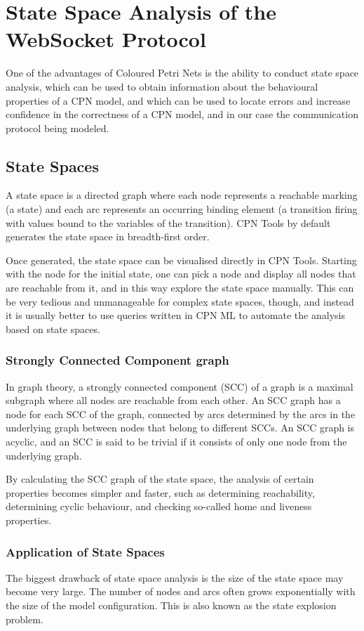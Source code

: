 \chapter{State Space Analysis of the WebSocket Protocol}
\label{chap:statespace}

One of the advantages of Coloured Petri Nets is the ability to conduct state
space analysis, which can be used to obtain information about the
behavioural properties of a CPN model, and which can be used to locate errors
and increase confidence in the correctness of a CPN model, and in our case the
communication protocol being modeled.

\section{State Spaces}
A state space is a directed graph where each node represents a reachable marking
(a state) and each arc represents an occurring binding element (a transition
firing with values bound to the variables of the transition). CPN Tools
by default generates the state space in breadth-first order. 

Once generated, the state space can be visualised directly in CPN Tools.
Starting with the node for the initial state, one can pick a node and display
all nodes that are reachable from it, and in this way explore the state space
manually. This can be very tedious and unmanageable for complex state spaces,
though, and instead it is usually better to use queries written in CPN ML to
automate the analysis based on state spaces.

	\subsection{Strongly Connected Component graph}
	In graph theory, a strongly connected component (SCC) of a graph is a maximal
	subgraph where all nodes are reachable from each other. An SCC graph has a node
	for each SCC of the graph, connected by arcs determined by the arcs in the
	underlying graph between nodes that belong to different SCCs. An
	SCC graph is acyclic, and an SCC is said to be trivial if it consists of only
	one node from the underlying graph.
	
	By calculating the SCC graph of the state space, the analysis of certain
	properties becomes simpler and faster, such as determining reachability,
	determining cyclic behaviour, and checking so-called home and liveness
	properties.

	\subsection{Application of State Spaces}
		The biggest drawback of state space analysis is the size of the state space
		may become very large. The number of nodes and arcs often grows exponentially
		with the size of the model configuration.
		This is also known as the state explosion problem.
		
